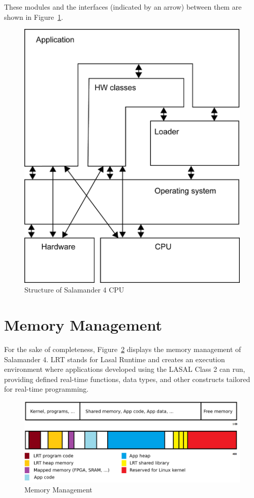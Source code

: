 \documentclass[MMR,Master,english]{twbook}
\begin{document}
\clearpage
\noindent These modules and the interfaces (indicated by an arrow) between them are shown in Figure~\ref{fig:lasal_cpu}.

\begin{figure}[H]
	\centering
	\includegraphics[width=0.5\columnwidth]{img/Software-Struktur_einer_LASAL_CPU.png}
	\caption[Structure of Salamander 4 CPU]{Structure of Salamander 4 CPU}
	\label{fig:lasal_cpu}
\end{figure}

\section{Memory Management}
\noindent For the sake of completeness, Figure~\ref{fig:memory_management} displays the memory management of Salamander 4. LRT stands for Lasal Runtime and creates an execution environment where applications developed using the LASAL Class 2 can run, providing defined real-time functions, data types, and other constructs tailored for real-time programming.

\begin{figure}[H]
	\centering
	\includegraphics[width=0.8\columnwidth]{img/RAM_Memory_management.png}
	\caption[Memory Management]{Memory Management}
	\label{fig:memory_management}
\end{figure}

\clearpage
\end{document}
